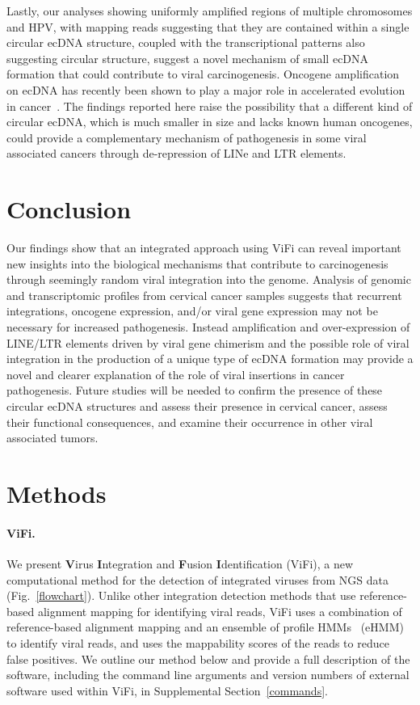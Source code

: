 \documentclass{bmcart}
\begin{document}
Lastly, our analyses showing uniformly amplified regions of multiple chromosomes and HPV, with mapping reads suggesting that they are contained within a single circular ecDNA structure, coupled with the transcriptional patterns also suggesting circular structure, suggest a novel mechanism of small ecDNA formation that could contribute to viral carcinogenesis. Oncogene amplification on ecDNA has recently been shown to play a major role in accelerated evolution in cancer~\cite{Turner2017}. The findings reported here raise the possibility that a different kind of circular ecDNA, which is much smaller in size and lacks known human oncogenes, could provide a complementary mechanism of pathogenesis in some viral associated cancers through de-repression of LINe and LTR elements. 

\section*{Conclusion}
Our findings show that an integrated approach using ViFi can reveal important new insights into the biological mechanisms that contribute to carcinogenesis through seemingly random viral integration into the genome.  Analysis of genomic and transcriptomic profiles from cervical cancer samples suggests that recurrent integrations, oncogene expression, and/or viral gene expression may not be necessary for increased pathogenesis. Instead amplification and over-expression of LINE/LTR elements driven by viral gene chimerism and the possible role of viral integration in the production of a unique type of ecDNA formation may provide a novel and clearer explanation of the role of viral insertions in cancer pathogenesis.  Future studies will be needed to confirm the presence of these circular ecDNA structures and assess their presence in cervical cancer, assess their functional consequences, and examine their occurrence in other viral associated tumors.

\section*{Methods}
\paragraph{\textbf{ViFi.}}
We present \textbf{V}irus \textbf{I}ntegration and \textbf{F}usion \textbf{I}dentification (ViFi), a new computational method for the detection of integrated viruses from NGS data (Fig.~\ref{flowchart}).  Unlike other integration detection methods that use reference-based alignment mapping for identifying viral reads, ViFi uses a combination of reference-based alignment mapping and an ensemble of profile HMMs~\cite{Nguyen2016_hippi} (eHMM) to identify viral reads, and uses the mappability scores of the reads to reduce false positives.  We outline our method below and provide a full description of the software, including the command line arguments and version numbers of external software used within ViFi, in Supplemental Section~\ref{commands}. 
\end{document}
